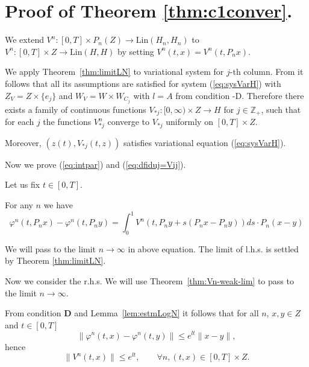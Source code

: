 \section{Proof of Theorem \ref{thm:c1conver}.}
\label{sec:c1converproof}




We extend $V^n:[0,T] \times P_n(Z)  \to \mbox{Lin}(H_n,H_n)$ to $V^n:[0,T] \times Z \to \mbox{Lin}(H,H)$ by setting $V^n(t,x)=V^n(t,P_nx)$.


We apply Theorem~\ref{thm:limitLN}  to variational system for $j$-th column. From \VL it follows that all its assumptions are satisfied
for system (\ref{eq:sysVarH}) with $Z_V=Z \times \{e_j\}$ and $W_V=W \times W_{C_j}$ with $l=A$ from condition \VL{}-D.  Therefore
there exists a family of continuous functions
$V_{\ast j}:[0,\infty)\times Z \to H$ for $j \in \mathbb{Z}_+$, such that for each $j$ the functions
$V^{n}_{\ast j}$ converge to $V_{\ast j}$ uniformly on $[0,T] \times Z$.

Moreover, $(z(t),V_{\ast j}(t,z))$ satisfies variational equation (\ref{eq:sysVarH}).


Now we  prove (\ref{eq:intpar}) and (\ref{eq:dfiduj=Vij}).

Let us fix $t \in [0,T]$.

For any  $n$ we have
\begin{equation}
  \varphi^n(t,P_n x) - \varphi^n(t,P_n y) =   \int^1_0 V^n(t,P_n y+s(P_n x- P_n y))ds \cdot P_n(x-y)
\end{equation}

We will pass to the limit $n \to \infty$ in above equation. The limit of l.h.s.
is settled by Theorem \ref{thm:limitLN}.


Now we consider the r.h.s.  We will use Theorem~\ref{thm:Vn-weak-lim} to pass to the limit $n \to \infty$.

From condition \textbf{D}  and Lemma~\ref{lem:estmLogN} it follows that for all $n$, $x,y \in Z$ and $t \in [0,T]$
\begin{equation*}
  \|\varphi^n(t,x) - \varphi^n(t,y)\| \leq e^{lt} \|x-y\|,
\end{equation*}
hence
\begin{equation}
  \|V^n(t,x)\| \leq e^{lt}, \qquad \forall n, (t,x) \in [0,T] \times Z. \label{eq:VnlogN}
\end{equation}


